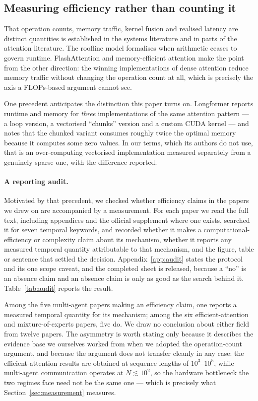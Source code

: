 \subsection{Measuring efficiency rather than counting it}

That operation counts, memory traffic, kernel fusion and realised latency are
distinct quantities is established in the systems literature and in parts of
the attention literature. The roofline model \citep{williams2009roofline}
formalises when arithmetic ceases to govern runtime. FlashAttention
\citep{dao2022flashattention} and memory-efficient attention
\citep{rabe2021selfattention} make the point from the other direction: the
winning implementations of dense attention reduce memory traffic without
changing the operation count at all, which is precisely the axis a FLOPs-based
argument cannot see.

One precedent anticipates the distinction this paper turns on. Longformer
reports runtime and memory for \emph{three} implementations of the same
attention pattern --- a loop version, a vectorised ``chunks'' version and a
custom CUDA kernel --- and notes that the chunked variant consumes roughly
twice the optimal memory because it computes some zero values. In our terms,
which its authors do not use, that is an over-computing vectorised
implementation measured separately from a genuinely sparse one, with the
difference reported.

\paragraph{A reporting audit.} Motivated by that precedent, we checked whether
efficiency claims in the papers we drew on are accompanied by a measurement.
For each paper we read the full text, including appendices and the official
supplement where one exists, searched it for seven temporal keywords, and
recorded whether it makes a computational-efficiency or complexity claim about
its mechanism, whether it reports any measured temporal quantity attributable
to that mechanism, and the figure, table or sentence that settled the decision.
Appendix~\ref{app:audit} states the protocol and its one scope caveat, and the
completed sheet is released, because a ``no'' is an absence claim and an
absence claim is only as good as the search behind it.
Table~\ref{tab:audit} reports the result.

Among the five multi-agent papers making an efficiency claim, one reports a
measured temporal quantity for its mechanism; among the six
efficient-attention and mixture-of-experts papers, five do. We draw no
conclusion about either field from twelve papers. The asymmetry is worth
stating only because it describes the evidence base we ourselves worked from
when we adopted the operation-count argument, and because the argument does not
transfer cleanly in any case: the efficient-attention results are obtained at
sequence lengths of $10^3$--$10^5$, while
multi-agent communication operates at $N \lesssim 10^2$, so the hardware
bottleneck the two regimes face need not be the same one --- which is precisely
what Section~\ref{sec:measurement} measures.

